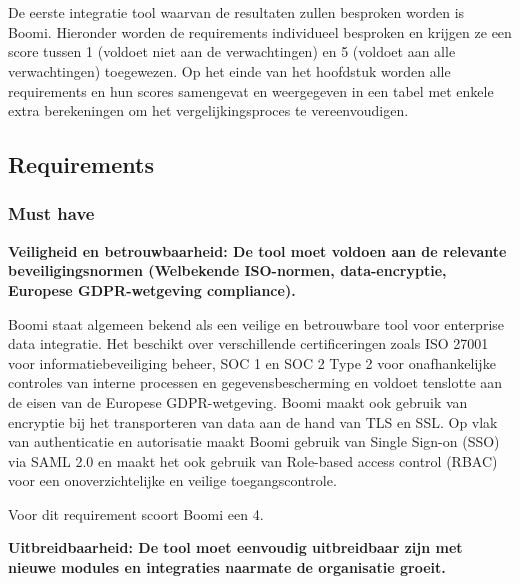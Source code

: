 \chapter{}
\label{ch:Boomi}

De eerste integratie tool waarvan de resultaten zullen besproken worden is Boomi. Hieronder worden de requirements individueel besproken en krijgen ze een score tussen 1 (voldoet niet aan de verwachtingen) en 5 (voldoet aan alle verwachtingen) toegewezen. Op het einde van het hoofdstuk worden alle requirements en hun scores samengevat en weergegeven in een tabel met enkele extra berekeningen om het vergelijkingsproces te vereenvoudigen.

\section{Requirements}%
\label{RequirementsBoomi}

\subsection{Must have}%
\label{MustHaveBoomi}

\textbf{Veiligheid en betrouwbaarheid: De tool moet voldoen aan de relevante beveiligingsnormen (Welbekende ISO-normen, data-encryptie, Europese GDPR-wetgeving compliance).}

\vspace{\baselineskip}

Boomi staat algemeen bekend als een veilige en betrouwbare tool voor enterprise data integratie. Het beschikt over verschillende certificeringen zoals ISO 27001 voor informatiebeveiliging beheer, SOC 1 en SOC 2 Type 2 voor onafhankelijke controles van interne processen en gegevensbescherming en voldoet tenslotte aan de eisen van de Europese GDPR-wetgeving. Boomi maakt ook gebruik van encryptie bij het transporteren van data aan de hand van TLS en SSL. Op vlak van authenticatie en autorisatie maakt Boomi gebruik van Single Sign-on (SSO) via SAML 2.0 en maakt het ook gebruik van Role-based access control (RBAC) voor een onoverzichtelijke en veilige toegangscontrole.

Voor dit requirement scoort Boomi een 4.

\vspace{\baselineskip}

\textbf{Uitbreidbaarheid: De tool moet eenvoudig uitbreidbaar zijn met nieuwe modules en integraties naarmate de organisatie groeit.}

